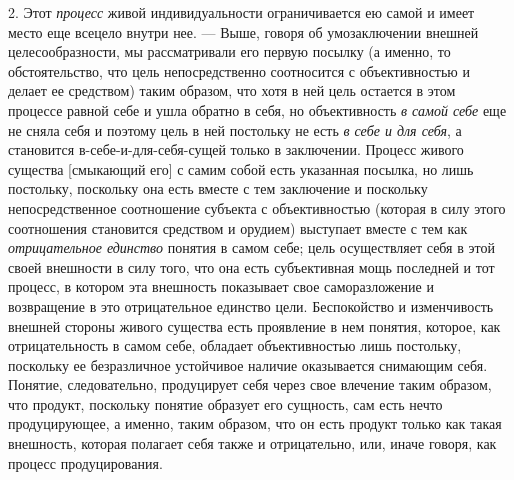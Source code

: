 \documentclass[twoside]{article}
\begin{document}
{{{2. Этот {\em процесс}
живой индивидуальности ограничивается ею самой и имеет место
еще всецело внутри нее. — Выше, говоря об умозаключении
внешней целесообразности, мы рассматривали его первую посылку (а именно, то
обстоятельство, что цель непосредственно соотносится с объективностью и
делает ее средством) таким образом, что хотя в ней цель остается в этом
процессе равной себе и ушла обратно в себя, но объективность
{\em в самой себе} еще не
сняла себя и поэтому цель в ней постольку не есть
{\em в себе и для себя},
а становится в-себе-и-для-себя-сущей только в заключении.
Процесс живого существа [смыкающий его] с самим собой есть указанная
посылка, но лишь постольку, поскольку она есть вместе с тем заключение и
поскольку непосредственное соотношение субъекта с объективностью (которая в
силу этого соотношения становится средством и орудием) выступает вместе с
тем как {\em отрицательное единство}
понятия в самом себе; цель осуществляет себя в этой своей
внешности в силу того, что она есть субъективная мощь последней и тот
процесс, в котором эта внешность показывает свое саморазложение
и возвращение в это отрицательное единство цели.
Беспокойство и изменчивость внешней стороны живого существа есть проявление
в нем понятия, которое, как отрицательность в самом себе, обладает
объективностью лишь постольку, поскольку ее безразличное устойчивое наличие
оказывается снимающим себя. Понятие, следовательно, продуцирует себя через
свое влечение таким образом, что продукт, поскольку понятие образует его
сущность, сам есть нечто продуцирующее, а именно, таким образом, что он
есть продукт только как такая внешность, которая полагает себя также и
отрицательно, или, иначе говоря, как процесс продуцирования.

}}}
\end{document}
